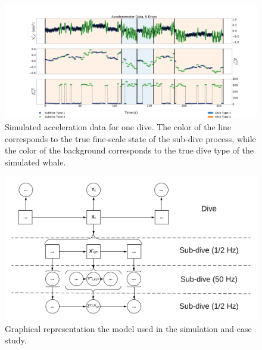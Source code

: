 
\begin{figure}[ht]
	\centering
	\includegraphics[width=5in]{../Plots/sim_data.png}
	\caption{Simulated acceleration data for one dive. The color of the line corresponds to the true fine-scale state of the sub-dive process, while the color of the background corresponds to the true dive type of the simulated whale.}
	\label{fig:sim_data}
\end{figure}

\begin{figure}[ht]
	\centering
	\includegraphics[width=5in]{../Plots/CarHHMM-DFT.png}
	\caption{Graphical representation the model used in the simulation and case study.}
	\label{fig:CarHHMM-DFT}
\end{figure}

